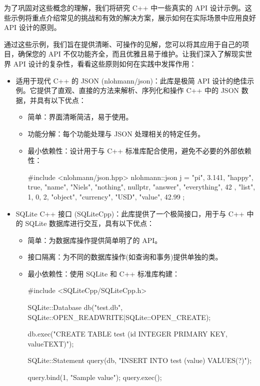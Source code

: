 为了巩固对这些概念的理解，我们将研究 C++ 中一些真实的 API 设计示例。这些示例将重点介绍常见的挑战和有效的解决方案，展示如何在实际场景中应用良好 API 设计的原则。

通过这些示例，我们旨在提供清晰、可操作的见解，您可以将其应用于自己的项目，确保您的 API 不仅功能齐全，而且优雅且易于维护。让我们深入了解现实世界 API 设计的复杂性，看看这些原则如何在实践中发挥作用：

\begin{itemize}
\item
适用于现代 C++ 的 JSON (nlohmann/json)：此库是极简 API 设计的绝佳示例。它提供了直观、直接的方法来解析、序列化和操作 C++ 中的 JSON 数据，并具有以下优点：

\begin{itemize}
\item
简单：界面清晰简洁，易于使用。

\item
功能分解：每个功能处理与 JSON 处理相关的特定任务。

\item
最小依赖性：设计用于与 C++ 标准库配合使用，避免不必要的外部依赖性：

\begin{cpp}
#include <nlohmann/json.hpp>
nlohmann::json j = {
    {"pi", 3.141},
    {"happy", true},
    {"name", "Niels"},
    {"nothing", nullptr},
    {"answer", {
            {"everything", 42}
    }},
    {"list", {1, 0, 2}},
    {"object", {
            {"currency", "USD"},
            {"value", 42.99}
    }}
};
\end{cpp}
\end{itemize}

\item
SQLite C++ 接口 (SQLiteCpp)：此库提供了一个极简接口，用于与 C++ 中的 SQLite 数据库进行交互，具有以下优点：

\begin{itemize}
\item
简单：为数据库操作提供简单明了的 API。

\item
接口隔离：为不同的数据库操作(如查询和事务)提供单独的类。

\item
最小依赖性：使用 SQLite 和 C++ 标准库构建：

\begin{cpp}
#include <SQLiteCpp/SQLiteCpp.h>

SQLite::Database db("test.db", SQLite::OPEN_READWRITE|SQLite::OPEN_CREATE);

db.exec("CREATE TABLE test (id INTEGER PRIMARY KEY, valueTEXT)");

SQLite::Statement query(db, "INSERT INTO test (value) VALUES(?)");

query.bind(1, "Sample value");
query.exec();
\end{cpp}
\end{itemize}
\end{itemize}






















